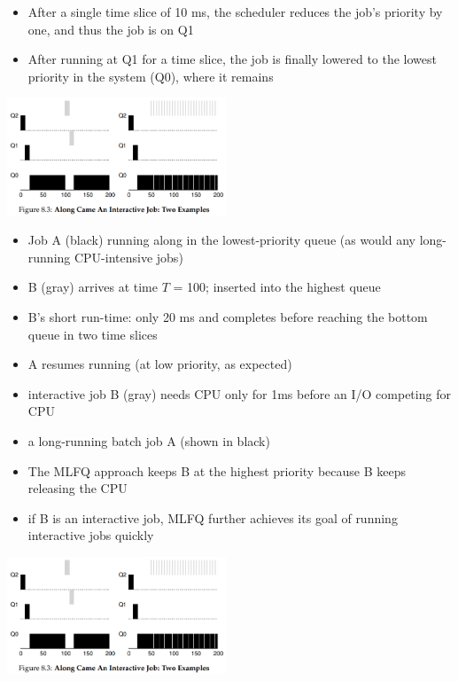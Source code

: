 \documentclass[8pt,a4paper,landscape]{extarticle}
\begin{document}
\begin{multicols*}{3}
\begin{minipage}{.6\linewidth}
\begin{itemize}
  \item  After a single time slice of 10 ms, the scheduler reduces the job's priority by one, and thus the job is on Q1
  \item After running at Q1 for a time slice, the job is finally lowered to the lowest priority in the system (Q0), where it remains
  \end{itemize}
\end{minipage}
\includegraphics[width=\linewidth,height=3.5cm]{imgs/sched_long2}
\begin{minipage}{.5\linewidth}
  \flushleft
  \begin{itemize}
  \item  Job A (black) running along in the lowest-priority queue (as would any long-running CPU-intensive jobs)
  \item B (gray) arrives at time $T$ = 100; inserted into the highest queue
  \item B's short run-time: only 20 ms and completes before reaching the bottom queue in two time slices
  \item A resumes running (at low priority, as expected)
  \end{itemize}
\end{minipage}
\begin{minipage}{.5\linewidth}
  \flushleft
  \begin{itemize}
  \item interactive job B (gray) needs CPU only for 1ms before an I/O competing for CPU
  \item a long-running batch job A (shown in black)
  \item The MLFQ approach keeps B at the highest priority because B keeps releasing the CPU
  \item if B is an interactive job, MLFQ further achieves its goal of running interactive jobs quickly
  \end{itemize}
\end{minipage}
\includegraphics[width=\linewidth,height=3.5cm]{imgs/sched_long2}

\end{multicols*}
\end{document}

